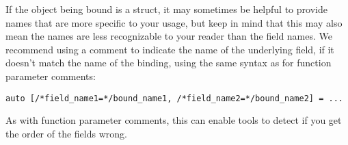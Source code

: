 If the object being bound is a struct, it may sometimes be helpful to provide names that are more specific to your usage, but keep in mind that this may also mean the names are less recognizable to your reader than the field names. We recommend using a comment to indicate the name of the underlying field, if it doesn't match the name of the binding, using the same syntax as for function parameter comments:
\begin{verbatim}
auto [/*field_name1=*/bound_name1, /*field_name2=*/bound_name2] = ...
\end{verbatim}
As with function parameter comments, this can enable tools to detect if you get the order of the fields wrong.


